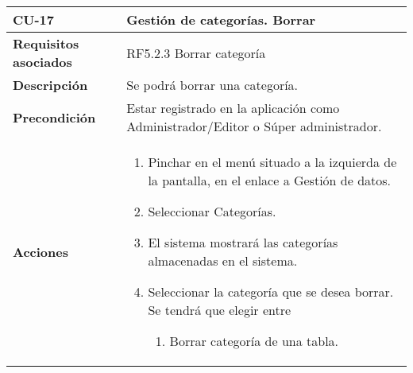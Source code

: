 \newpage
\begin{longtable}[H]{@{}ll@{}}
\toprule
\begin{minipage}[b]{0.23\columnwidth}\raggedright\strut
\textbf{CU-17}\strut
\end{minipage} & \begin{minipage}[b]{0.71\columnwidth}\raggedright\strut
\textbf{Gestión de categorías. Borrar}\strut
\end{minipage}\tabularnewline
\midrule
\endhead
\begin{minipage}[t]{0.23\columnwidth}\raggedright\strut
\textbf{Requisitos asociados}\strut
\end{minipage} & \begin{minipage}[t]{0.71\columnwidth}\raggedright\strut
RF5.2.3 Borrar categoría\strut
\end{minipage}\tabularnewline
\begin{minipage}[t]{0.23\columnwidth}\raggedright\strut
\textbf{Descripción}\strut
\end{minipage} & \begin{minipage}[t]{0.71\columnwidth}\raggedright\strut
Se podrá borrar una categoría.
\strut
\end{minipage}\tabularnewline
\begin{minipage}[t]{0.23\columnwidth}\raggedright\strut
\textbf{Precondición}\strut
\end{minipage} & \begin{minipage}[t]{0.71\columnwidth}\raggedright\strut
Estar registrado en la aplicación como Administrador/Editor o Súper administrador.\strut
\end{minipage}\tabularnewline
\begin{minipage}[t]{0.23\columnwidth}\raggedright\strut
\textbf{Acciones}\strut
\end{minipage} & \begin{minipage}[t]{0.71\columnwidth}\raggedright\strut
\begin{enumerate}
\def\labelenumi{\arabic{enumi}.}
\tightlist
\item
Pinchar en el menú situado a la izquierda de la pantalla, en el
enlace a Gestión de datos.
\item
Seleccionar Categorías.
\item
El sistema mostrará las categorías almacenadas en el sistema.
\item
Seleccionar la categoría que se desea borrar. Se tendrá que elegir entre
\begin{enumerate}
    \item Borrar categoría de una tabla.

\end{enumerate}
\end{enumerate}
\end{minipage}
\end{longtable}
